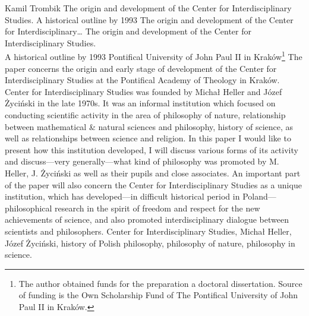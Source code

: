 \begin{artengenv}{Kamil Trombik}
	{The origin and development of the Center for Interdisciplinary Studies. A historical outline by 1993}
	{The origin and development of the Center for Interdisciplinary\ldots}
	{The origin and development of the Center for Interdisciplinary Studies.\\A historical outline by 1993}
	{Pontifical\label{trombik-start} University of John Paul II in Kraków\footnote{The author obtained funds for the
			preparation a doctoral dissertation. Source of funding is the Own Scholarship Fund of The Pontifical University of John
			Paul II in Kraków.}}
	{The paper concerns the origin and early stage of development of the Center for Interdisciplinary Studies at the
		Pontifical Academy of Theology in Kraków. Center for Interdisciplinary Studies was founded by Michał Heller and Józef
		Życiński in the late 1970s. It was an informal institution which focused on conducting scientific activity in the area
		of philosophy of nature, relationship between mathematical \& natural sciences and philosophy, history of science, as
		well as relationships between science and religion. In this paper I would like to present how this institution
		developed, I will discuss various forms of its activity and discuss---very generally---what kind of philosophy was promoted
		by M. Heller, J. Życiński as well as their pupils and close associates. An important part of the paper will also concern
		the Center for Interdisciplinary Studies as a unique institution, which has developed---in difficult historical
		period in Poland---philosophical research in the spirit of freedom and respect for the new achievements of science, and
		also promoted interdisciplinary dialogue between scientists and philosophers.}
	{Center for Interdisciplinary Studies, Michał Heller, Józef Życiński, history of Polish philosophy, philosophy of nature, philosophy in science.}





\end{artengenv}
